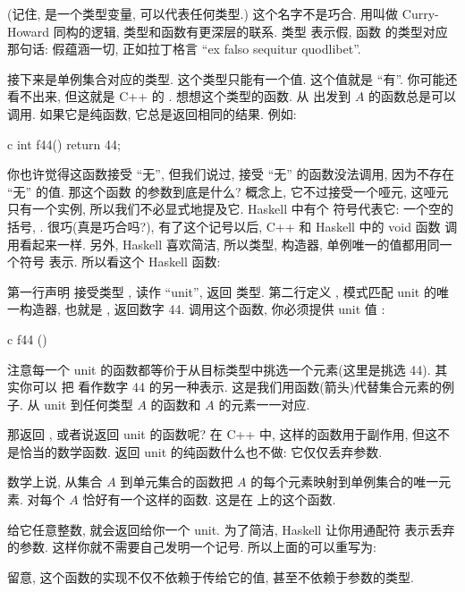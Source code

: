 
(记住,  是一个类型变量, 可以代表任何类型.) 这个名字不是巧合. 用叫做 Curry-Howard 同构的逻辑,
类型和函数有更深层的联系. 类型  表示假, 函数  的类型对应那句话: 假蕴涵一切,
正如拉丁格言 ``ex falso sequitur quodlibet''.

接下来是单例集合对应的类型. 这个类型只能有一个值. 这个值就是 ``有''. 你可能还看不出来, 但这就是 C++
的 . 想想这个类型的函数. 从  出发到 $A$ 的函数总是可以调用. 如果它是纯函数,
它总是返回相同的结果. 例如:

\begin{snip}{c}
int f44() { return 44; }
\end{snip}

你也许觉得这函数接受 ``无'', 但我们说过, 接受 ``无'' 的函数没法调用, 因为不存在 ``无'' 的值. 那这个函数
的参数到底是什么? 概念上, 它不过接受一个哑元, 这哑元只有一个实例, 所以我们不必显式地提及它. Haskell 中有个
符号代表它: 一个空的括号, \code{()}. 很巧(真是巧合吗?), 有了这个记号以后, C++ 和 Haskell 中的 void 函数
调用看起来一样. 另外, Haskell 喜欢简洁, 所以类型, 构造器, 单例唯一的值都用同一个符号 \code{()} 表示.
所以看这个 Haskell 函数:


第一行声明  接受类型 \code{()}, 读作 ``unit'', 返回  类型. 第二行定义 ,
模式匹配 unit 的唯一构造器, 也就是 \code{()}, 返回数字 44. 调用这个函数, 你必须提供 unit 值 \code{()}:

\begin{snip}{c}
f44 ()
\end{snip}

注意每一个 unit 的函数都等价于从目标类型中挑选一个元素(这里是挑选  44). 其实你可以
把  看作数字 44 的另一种表示. 这是我们用函数(箭头)代替集合元素的例子. 从 unit 到任何类型 $A$
的函数和 $A$ 的元素一一对应.

那返回 , 或者说返回 unit 的函数呢? 在 C++ 中, 这样的函数用于副作用, 但这不是恰当的数学函数.
返回 unit 的纯函数什么也不做: 它仅仅丢弃参数.

数学上说, 从集合 $A$ 到单元集合的函数把 $A$ 的每个元素映射到单例集合的唯一元素. 对每个 $A$
恰好有一个这样的函数. 这是在  上的这个函数.

给它任意整数, 就会返回给你一个 unit. 为了简洁, Haskell 让你用通配符 \code{\_} 表示丢弃的参数.
这样你就不需要自己发明一个记号. 所以上面的可以重写为:

留意, 这个函数的实现不仅不依赖于传给它的值, 甚至不依赖于参数的类型.

